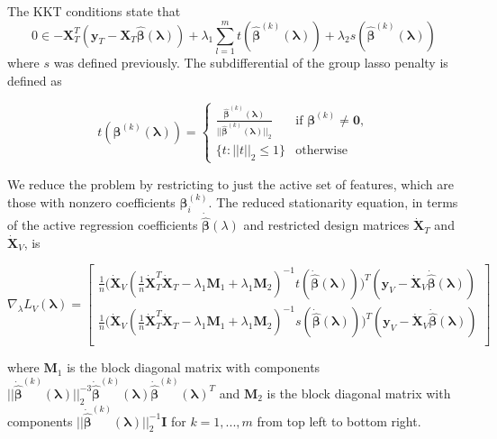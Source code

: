 \documentclass[10pt,letterpaper]{article}
\begin{document}
The KKT conditions state that
\begin{equation}
0 \in -\boldsymbol{X}_T^T(\boldsymbol{y}_T - \boldsymbol{X}_T \hat{\boldsymbol{\beta}}(\boldsymbol{\lambda}))
+ \lambda_1 \sum\limits_{l=1}^m t(\hat{\boldsymbol{\beta}}^{(k)}(\boldsymbol{\lambda}))
+ \lambda_2 s(\hat{\boldsymbol{\beta}}^{(k)}(\boldsymbol{\lambda}))
\end{equation}
where $s$ was defined previously. The subdifferential of the group lasso penalty is defined as

\begin{equation}
t(\boldsymbol{\beta}^{(k)}(\boldsymbol{\lambda})) = \begin{cases}
  \frac{ \hat{\boldsymbol{\beta}}^{(k)}(\boldsymbol{\lambda})}{||\hat{\boldsymbol{\beta}}^{(k)}(\boldsymbol{\lambda}) ||_2} & \text{if } \boldsymbol\beta^{(k)} \ne \boldsymbol{0}, \\
\{t : ||t||_2 \le 1\} & \text{otherwise}
\end{cases}
\end{equation}

We reduce the problem by restricting to just the active set of features, which are those with nonzero coefficients $\boldsymbol{\beta}^{(k)}_i$. The reduced stationarity equation, in terms of the active regression coefficients $\dot{\hat{\boldsymbol{\beta}}} (\lambda)$ and restricted design matrices $\dot{\boldsymbol{X}}_T$ and $\dot{\boldsymbol{X}}_V$, is

\begin{equation}
\nabla_\lambda L_V(\boldsymbol{\lambda}) =
\begin{bmatrix}
\frac{1}{n}
\Bigg (
\dot{\boldsymbol{X}}_V
(\frac{1}{n} \dot{\boldsymbol{X}}_T^T \dot{\boldsymbol{X}}_T - \lambda_1 \boldsymbol{M}_1 + \lambda_1 \boldsymbol{M}_2)^{-1}
t(\dot{\hat{\boldsymbol{\beta}}}(\boldsymbol{\lambda}))
\Bigg )^T
(\boldsymbol{y}_V - \dot{\boldsymbol{X}}_V \dot{\hat{\boldsymbol{\beta}}}(\boldsymbol{\lambda}))
 \\
\frac{1}{n}
\Bigg (\dot{\boldsymbol{X}}_V
(\frac{1}{n} \dot{\boldsymbol{X}}_T^T \dot{\boldsymbol{X}}_T - \lambda_1 \boldsymbol{M}_1 + \lambda_1 \boldsymbol{M}_2)^{-1}
s(\dot{\hat{\boldsymbol{\beta}}}(\boldsymbol{\lambda}))
\Bigg )^T
(\boldsymbol{y}_V - \dot{\boldsymbol{X}}_V \dot{\hat{\boldsymbol{\beta}}}(\boldsymbol{\lambda}))
\\ 
\end{bmatrix}
\end{equation}

where $\boldsymbol{M}_1$ is the block diagonal matrix with  components 
$
|| \dot{\hat{\boldsymbol{\beta}}}^{(k)}(\boldsymbol{\lambda})||_2^{-3} \dot{\hat{\boldsymbol{\beta}}}^{(k)}(\boldsymbol{\lambda}) \dot{\hat{\boldsymbol{\beta}}}^{(k)}(\boldsymbol{\lambda})^T
$ and $\boldsymbol{M}_2$ is the block diagonal matrix with components
$||\dot{\hat{\boldsymbol{\beta}}}^{(k)}(\boldsymbol{\lambda})||_2^{-1} \boldsymbol{I}$
for $k = 1, ..., m$ 
from top left to bottom right.
\end{document}

